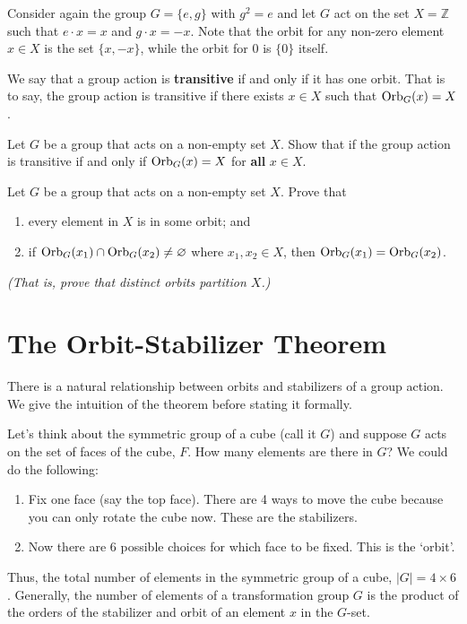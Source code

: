 \begin{example}
    Consider again the group $G = \{e, g\}$ with $g^2 = e$ and let $G$ act on the set $X = \mathbb{Z}$ such that $e \cdot x = x$ and $g \cdot x = -x$. Note that the orbit for any non-zero element $x \in X$ is the set $\{x, -x\}$, while the orbit for 0 is $\{0\}$ itself.
\end{example}

We say that a group action is \textbf{transitive} if and only if it has one orbit. That is to say, the group action is transitive if there exists $x \in X$ such that $\mathrm{Orb}_{G}(x) = X$.

\begin{exercise}
    Let $G$ be a group that acts on a non-empty set $X$. Show that if the group action is transitive if and only if $\mathrm{Orb}_{G}(x) = X$ for \textbf{all} $x \in X$.
\end{exercise}

\begin{exercise}\label{exercise-distinct-orbits-partition-set}
    Let $G$ be a group that acts on a non-empty set $X$. Prove that
    \begin{enumerate}[label=(\alph*)]
        \item every element in $X$ is in some orbit; and
        \item if $\mathrm{Orb}_{G}(x_1) \cap \mathrm{Orb}_{G}(x_2) \neq \varnothing$ where $x_1, x_2 \in X$, then $\mathrm{Orb}_{G}(x_1) = \mathrm{Orb}_{G}(x_2)$.
    \end{enumerate}
    \textit{(That is, prove that distinct orbits partition $X$.)}
\end{exercise}

\section{The Orbit-Stabilizer Theorem}
There is a natural relationship between orbits and stabilizers of a group action. We give the intuition of the theorem before stating it formally.

Let's think about the symmetric group of a cube (call it $G$) and suppose $G$ acts on the set of faces of the cube, $F$. How many elements are there in $G$? We could do the following:
\begin{enumerate}
    \item Fix one face (say the top face). There are 4 ways to move the cube because you can only rotate the cube now. These are the stabilizers.
    \item Now there are 6 possible choices for which face to be fixed. This is the `orbit'.
\end{enumerate}
Thus, the total number of elements in the symmetric group of a cube, $|G| = 4 \times 6$. Generally, the number of elements of a transformation group $G$ is the product of the orders of the stabilizer and orbit of an element $x$ in the $G$-set.

